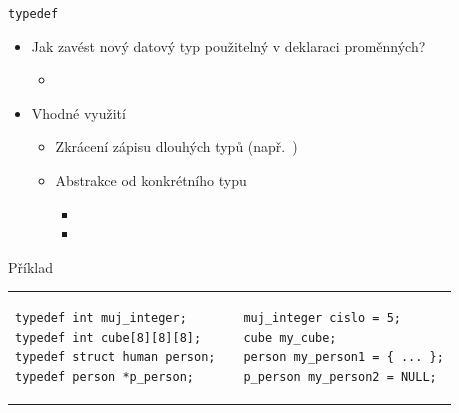 \begin{frame}[fragile]{\texttt{typedef}}

  \begin{itemize}
    \item Jak zavést nový datový typ použitelný v deklaraci proměnných?
    \begin{itemize}
      \item {}
    \end{itemize}


    \item Vhodné využití
    \begin{itemize}
      \item Zkrácení zápisu dlouhých typů (např.\ )
      \item Abstrakce od konkrétního typu
      \begin{itemize}
	\item {}
	\item {}
      \end{itemize}
    \end{itemize}

  \end{itemize}


  \begin{block}{Příklad}
    \begin{tabular}{lp{1em}l}
      \begin{lstlisting}
typedef int muj_integer;
typedef int cube[8][8][8];
typedef struct human person;
typedef person *p_person;
      \end{lstlisting} &&
      \begin{lstlisting}
muj_integer cislo = 5;
cube my_cube;
person my_person1 = { ... };
p_person my_person2 = NULL;
      \end{lstlisting}
    \end{tabular}
  \end{block}

\end{frame}


